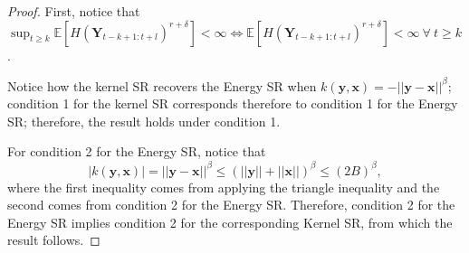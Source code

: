 \documentclass[twoside,11pt]{article}
\newcommand{\E}{\mathbb{E}}
\newcommand{\ddsim}{\mathbf{x}}
\newcommand{\ddobs}{\mathbf{y}}
\newcommand{\Ddobs}{\mathbf{Y}}
\begin{document}
	\begin{proof}
		First, notice that $ \sup_{t\ge k} \E\left[H(\Ddobs_{t-k+1:t+l})^{r+\delta}\right] <\infty \iff \E\left[H(\Ddobs_{t-k+1:t+l})^{r+\delta}\right] <\infty\ \forall \ t\ge k $.
		
		Notice how the kernel SR recovers the Energy SR when $ k(\ddobs,\ddsim) = -||\ddobs-\ddsim  ||^\beta $; condition 1 for the kernel SR corresponds therefore to condition 1 for the Energy SR; therefore, the result holds under condition 1.
		
		
		For condition 2 for the Energy SR, notice that \begin{equation}\label{key}
		|k(\ddobs,\ddsim)|= ||\ddobs-\ddsim  ||^\beta \le \left( ||\ddobs||+||\ddsim||  \right)^\beta \le (2B)^\beta,
		\end{equation}
		where the first inequality comes from applying the triangle inequality and the second comes from condition 2 for the Energy SR. Therefore, condition 2 for the Energy SR implies condition 2 for the corresponding Kernel SR, from which the result follows. 
		

\end{proof}
\end{document}
